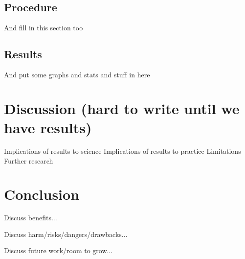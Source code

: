 \documentclass{sigchi}
\begin{document}
\subsection{Procedure}
And fill in this section too

\subsection{Results}
And put some graphs and stats and stuff in here

\section{Discussion (hard to write until we have results)}
Implications of results to science
Implications of results to practice 
Limitations
Further research 


\section{Conclusion}
Discuss benefits...

Discuss harm/risks/dangers/drawbacks...

Discuss future work/room to grow...








\balance{}



\end{document}
